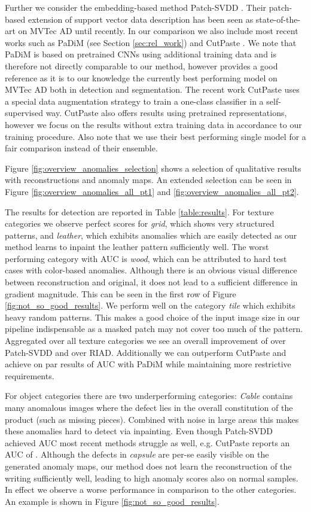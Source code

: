 \documentclass[final,5p,times,twocolumn]{elsarticle}
\begin{document}
	Further we consider the embedding-based method Patch-SVDD \cite{Yi_2020_ACCV}. Their patch-based extension of support vector data description has been seen as state-of-the-art on MVTec AD until recently. In our comparison we also include most recent works such as PaDiM \cite{defard2020padim} (see Section \ref{sec:rel_work}) and CutPaste \cite{li2021cutpaste}. We note that PaDiM is based on pretrained CNNs using additional training data and is therefore not directly comparable to our method, however provides a good reference as it is to our knowledge the currently best performing model on MVTec AD both in detection and segmentation.
	The recent work CutPaste uses a special data augmentation strategy to train a one-class classifier in a self-supervised way. CutPaste also offers results using pretrained representations, however we focus on the results without extra training data in accordance to our training procedure. Also note that we use their best performing single model for a fair comparison instead of their ensemble.
	
	Figure \ref{fig:overview_anomalies_selection} shows a selection of qualitative results with reconstructions and anomaly maps. An extended selection can be seen in Figure \ref{fig:overview_anomalies_all_pt1} and \ref{fig:overview_anomalies_all_pt2}.
	
	The results for detection are reported in Table \ref{table:results}.
	For texture categories we observe perfect scores for \textit{grid}, which shows very structured patterns, and \textit{leather}, which exhibits anomalies which are easily detected as our method learns to inpaint the leather pattern sufficiently well. 
	The worst performing category with  AUC is \textit{wood}, which can be attributed to hard test cases with color-based anomalies. Although there is an obvious visual difference between reconstruction and original, it does not lead to a sufficient difference in gradient magnitude. 
	This can be seen in the first row of Figure \ref{fig:not_so_good_results}.
	We perform well on the category \textit{tile} which exhibits heavy random patterns. This makes a good choice of the input image size in our pipeline indispensable as a masked patch may not cover too much of the pattern.
	Aggregated over all texture categories we see an overall improvement of  over Patch-SVDD and  over RIAD. 
	Additionally we can outperform CutPaste and achieve on par results of  AUC with PaDiM while maintaining more restrictive requirements.
	
	For object categories there are two underperforming categories: \textit{Cable} contains many anomalous images where the defect lies in the overall constitution of the product (such as missing pieces). Combined with noise in large areas this makes these anomalies hard to detect via inpainting. 
	Even though Patch-SVDD achieved  AUC most recent methods struggle as well, e.g. CutPaste reports an AUC of .
	Although the defects in \textit{capsule} are per-se easily visible on the generated anomaly maps, our method does not learn the reconstruction of the writing sufficiently well, leading to high anomaly scores also on normal samples. In effect we observe a worse performance in comparison to the other categories.
	An example is shown in Figure \ref{fig:not_so_good_results}.
	
\end{document}
